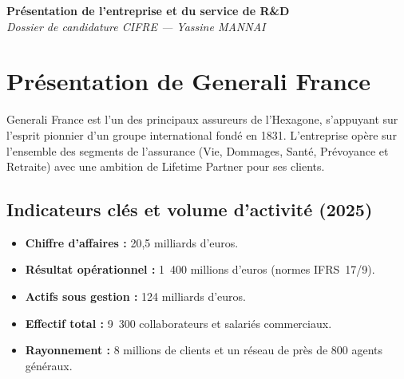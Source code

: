 \documentclass[10pt,a4paper]{article}
\begin{document}
\thispagestyle{fancy}

\begin{center}
  {\Large\bfseries Présentation de l'entreprise et du service de R\&D}\\[6pt]
  {\normalsize\itshape Dossier de candidature CIFRE --- Yassine MANNAI}
\end{center}

\vspace{0.4cm}

\section{Présentation de Generali France}

Generali France est l'un des principaux assureurs de l'Hexagone, s'appuyant
sur l'esprit pionnier d'un groupe international fondé en 1831.  L'entreprise
opère sur l'ensemble des segments de l'assurance (Vie, Dommages, Santé,
Prévoyance et Retraite) avec une ambition de \og{}Lifetime Partner\fg{} pour
ses clients.

\subsection{Indicateurs clés et volume d'activité (2025)}
\begin{itemize}[leftmargin=1.6em,itemsep=1pt]
  \item \textbf{Chiffre d'affaires :} 20,5 milliards d'euros.                   %
  \item \textbf{Résultat opérationnel :} 1~400 millions d'euros (normes IFRS~17/9). %
  \item \textbf{Actifs sous gestion :} 124 milliards d'euros.                   %
  \item \textbf{Effectif total :} 9~300 collaborateurs et salariés commerciaux.
  \item \textbf{Rayonnement :} 8 millions de clients et un réseau de près de 800 agents généraux.
\end{itemize}
\end{document}
